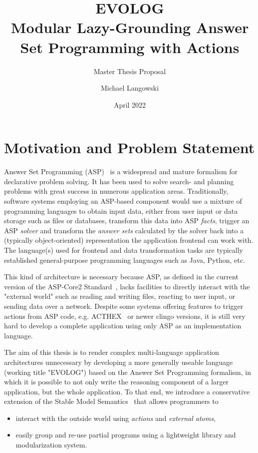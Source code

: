 \documentclass[12pt, letterpaper, twoside]{scrartcl}
\title{EVOLOG \\ Modular Lazy-Grounding Answer Set Programming with Actions}
\subtitle{Master Thesis Proposal}
\author{Michael Langowski}
\date{April 2022}
\begin{document}
\begin{titlepage}
\maketitle
\end{titlepage}

\section{Motivation and Problem Statement}
\label{sec:motivation}

Answer Set Programming (ASP)~\cite{asp-primer} is a widespread and mature formalism for declarative problem solving. It has been used to solve search- and planning problems with great success in numerous application areas. Traditionally, software systems employing an ASP-based component would use a mixture of programming languages to obtain input data, either from user input or data storage such as files or databases, transform this data into ASP \emph{facts}, trigger an ASP \emph{solver} and transform the \emph{answer sets} calculated by the solver back into a (typically object-oriented) representation the application frontend can work with. The language(s) used for frontend and data transformation tasks are typically established general-purpose programming languages such as Java, Python, etc.

This kind of architecture is necessary because ASP, as defined in the current version of the ASP-Core2 Standard~\cite{asp-core2}, lacks facilities to directly interact with the "external world" such as reading and writing files, reacting to user input, or sending data over a network. Despite some systems offering features to trigger actions from ASP code, e.g. ACTHEX~\cite{acthex} or newer clingo versions, it is still very hard to develop a complete application using only ASP as an implementation language.

The aim of this thesis is to render complex multi-language application architectures unnecessary by developing a more generally useable language (working title "EVOLOG") based on the Answer Set Programming formalism, in which it is possible to not only write the reasoning component of a larger application, but the whole application. To that end, we introduce a conservative extension of the Stable Model Semantics~\cite{stable-models} that allows programmers to
\begin{itemize}
	\item interact with the outside world using \emph{actions} and \emph{external atoms},
	\item easily group and re-use partial programs using a lightweight library and modularization system.
\end{itemize}
\end{document}
